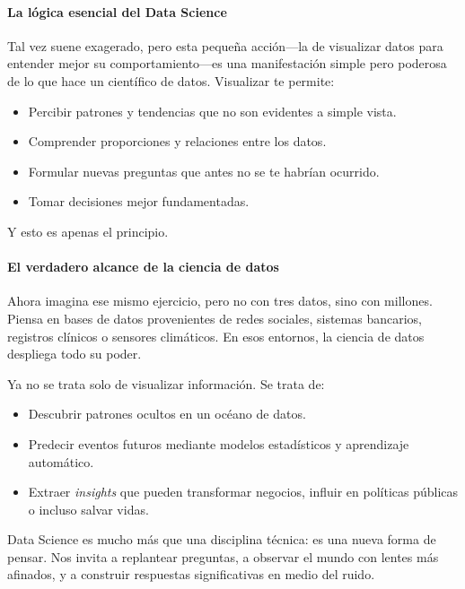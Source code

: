 \documentclass{article}
\theoremstyle{nonumberplain}
\begin{document}
\paragraph{La lógica esencial del Data Science}

Tal vez suene exagerado, pero esta pequeña acción—la de visualizar datos para entender mejor su comportamiento—es una manifestación simple pero poderosa de lo que hace un científico de datos. Visualizar te permite:

\begin{itemize}
    \item Percibir patrones y tendencias que no son evidentes a simple vista.
    \item Comprender proporciones y relaciones entre los datos.
    \item Formular nuevas preguntas que antes no se te habrían ocurrido.
    \item Tomar decisiones mejor fundamentadas.
\end{itemize}

Y esto es apenas el principio.

\paragraph{El verdadero alcance de la ciencia de datos}

Ahora imagina ese mismo ejercicio, pero no con tres datos, sino con millones. Piensa en bases de datos provenientes de redes sociales, sistemas bancarios, registros clínicos o sensores climáticos. En esos entornos, la ciencia de datos despliega todo su poder.

Ya no se trata solo de visualizar información. Se trata de:

\begin{itemize}
    \item Descubrir patrones ocultos en un océano de datos.
    \item Predecir eventos futuros mediante modelos estadísticos y aprendizaje automático.
    \item Extraer \textit{insights} que pueden transformar negocios, influir en políticas públicas o incluso salvar vidas.
\end{itemize}

Data Science es mucho más que una disciplina técnica: es una nueva forma de pensar. Nos invita a replantear preguntas, a observar el mundo con lentes más afinados, y a construir respuestas significativas en medio del ruido.
\end{document}
